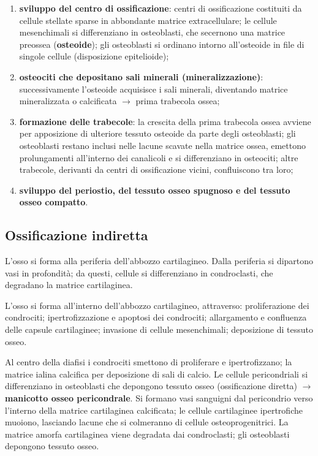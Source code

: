 \begin{enumerate}
  \item \textbf{sviluppo del centro di ossificazione}: centri di ossificazione costituiti da cellule stellate sparse in abbondante matrice extracellulare; le cellule mesenchimali si differenziano in osteoblasti, che secernono una matrice preossea (\textbf{osteoide}); gli osteoblasti si ordinano intorno all'osteoide in file di singole cellule (disposizione epitelioide);
  \item \textbf{osteociti che depositano sali minerali (mineralizzazione)}: successivamente l'osteoide acquisisce i sali minerali, diventando matrice mineralizzata o calcificata $\rightarrow$ prima trabecola ossea;
  \item \textbf{formazione delle trabecole}: la crescita della prima trabecola ossea avviene per apposizione di ulteriore tessuto osteoide da parte degli osteoblasti; gli osteoblasti restano inclusi nelle lacune scavate nella matrice ossea, emettono prolungamenti all'interno dei canalicoli e si differenziano in osteociti; altre trabecole, derivanti da centri di ossificazione vicini, confluiscono tra loro;
  \item \textbf{sviluppo del periostio, del tessuto osseo spugnoso e del tessuto osseo compatto}.
\end{enumerate}

\subsection{Ossificazione indiretta}

L'osso si forma alla periferia dell'abbozzo cartilagineo. Dalla periferia si dipartono vasi in profondità; da questi, cellule si differenziano in condroclasti, che degradano la matrice cartilaginea.

L'osso si forma all'interno dell'abbozzo cartilagineo, attraverso: proliferazione dei condrociti; ipertrofizzazione e apoptosi dei condrociti; allargamento e confluenza delle capsule cartilaginee; invasione di cellule mesenchimali; deposizione di tessuto osseo.

Al centro della diafisi i condrociti smettono di proliferare e ipertrofizzano; la matrice ialina calcifica per deposizione di sali di calcio. Le cellule pericondriali si differenziano in osteoblasti che depongono tessuto osseo (ossificazione diretta) $\rightarrow$ \textbf{manicotto osseo pericondrale}. Si formano vasi sanguigni dal pericondrio verso l'interno della matrice cartilaginea calcificata; le cellule cartilaginee ipertrofiche muoiono, lasciando lacune che si colmeranno di cellule osteoprogenitrici. La matrice amorfa cartilaginea viene degradata dai condroclasti; gli osteoblasti depongono tessuto osseo.

